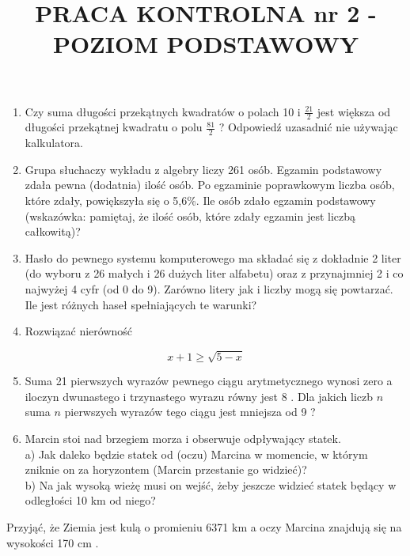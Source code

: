 \documentclass[10pt]{article}
\title{PRACA KONTROLNA nr 2 - POZIOM PODSTAWOWY }
\author{}
\date{}
\begin{document}
\maketitle
\begin{enumerate}
  \item Czy suma długości przekątnych kwadratów o polach 10 i $\frac{21}{2}$ jest większa od długości przekątnej kwadratu o polu $\frac{81}{2}$ ? Odpowiedź uzasadnić nie używając kalkulatora.
  \item Grupa słuchaczy wykładu z algebry liczy 261 osób. Egzamin podstawowy zdała pewna (dodatnia) ilość osób. Po egzaminie poprawkowym liczba osób, które zdały, powiększyła się o 5,6\%. Ile osób zdało egzamin podstawowy (wskazówka: pamiętaj, że ilość osób, które zdały egzamin jest liczbą całkowitą)?
  \item Hasło do pewnego systemu komputerowego ma składać się z dokładnie 2 liter (do wyboru z 26 małych i 26 dużych liter alfabetu) oraz z przynajmniej 2 i co najwyżej 4 cyfr (od 0 do 9). Zarówno litery jak i liczby mogą się powtarzać. Ile jest różnych haseł spełniających te warunki?
  \item Rozwiązać nierówność
\end{enumerate}

$$
x+1 \geqslant \sqrt{5-x}
$$

\begin{enumerate}
  \setcounter{enumi}{4}
  \item Suma 21 pierwszych wyrazów pewnego ciągu arytmetycznego wynosi zero a iloczyn dwunastego i trzynastego wyrazu równy jest 8 . Dla jakich liczb $n$ suma $n$ pierwszych wyrazów tego ciągu jest mniejsza od 9 ?
  \item Marcin stoi nad brzegiem morza i obserwuje odpływający statek.\\
a) Jak daleko będzie statek od (oczu) Marcina w momencie, w którym zniknie on za horyzontem (Marcin przestanie go widzieć)?\\
b) Na jak wysoką wieżę musi on wejść, żeby jeszcze widzieć statek będący w odległości 10 km od niego?
\end{enumerate}

Przyjąć, że Ziemia jest kulą o promieniu 6371 km a oczy Marcina znajdują się na wysokości 170 cm .
\end{document}
